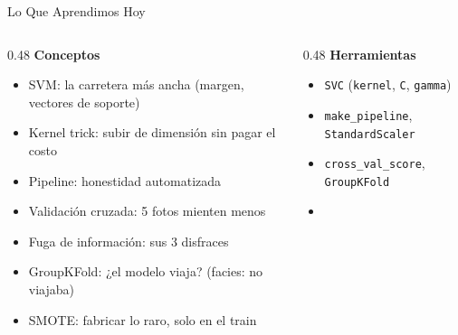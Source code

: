 \documentclass[aspectratio=169, 11pt]{beamer}
\begin{document}
\begin{frame}[shrink=10]{Lo Que Aprendimos Hoy}
  \vspace{-4pt}
  \begin{columns}[T]
    \begin{column}{0.48\textwidth}
      {\footnotesize\color{arcaDark}\bfseries Conceptos}
      \vspace{3pt}
      {\footnotesize\color{textMuted}
      \begin{itemize}\setlength{\itemsep}{2pt}
        \item[{\color{codeGreen}\scriptsize\faCheck}]
          SVM: la carretera más ancha (margen, vectores de soporte)
        \item[{\color{codeGreen}\scriptsize\faCheck}]
          Kernel trick: subir de dimensión sin pagar el costo
        \item[{\color{codeGreen}\scriptsize\faCheck}]
          Pipeline: honestidad automatizada
        \item[{\color{codeGreen}\scriptsize\faCheck}]
          Validación cruzada: 5 fotos mienten menos
        \item[{\color{codeGreen}\scriptsize\faCheck}]
          Fuga de información: sus 3 disfraces
        \item[{\color{codeGreen}\scriptsize\faCheck}]
          GroupKFold: ¿el modelo viaja? (facies: no viajaba)
        \item[{\color{codeGreen}\scriptsize\faCheck}]
          SMOTE: fabricar lo raro, solo en el train
      \end{itemize}
      }
    \end{column}
    \begin{column}{0.48\textwidth}
      {\footnotesize\color{arcaDark}\bfseries Herramientas}
      \vspace{3pt}
      {\footnotesize\color{textMuted}
      \begin{itemize}\setlength{\itemsep}{2pt}
        \item[{\color{arcaRed}\scriptsize\faTools}]
          \texttt{SVC} (\texttt{kernel}, \texttt{C}, \texttt{gamma})
        \item[{\color{arcaRed}\scriptsize\faTools}]
          \texttt{make\_pipeline}, \texttt{StandardScaler}
        \item[{\color{arcaRed}\scriptsize\faTools}]
          \texttt{cross\_val\_score}, \texttt{GroupKFold}
        \item[{\color{arcaRed}\scriptsize\faTools}]

\end{itemize}}
\end{column}
\end{columns}
\end{frame}
\end{document}
